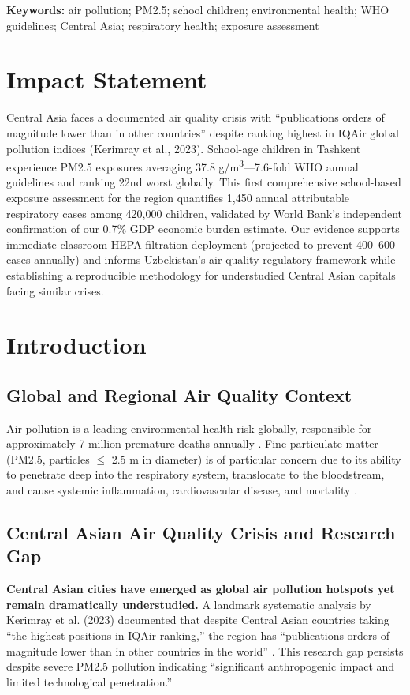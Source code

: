 \documentclass[11pt,a4paper]{article}
\begin{document}
\noindent\textbf{Keywords:} air pollution; PM2.5; school children; environmental health; WHO guidelines; Central Asia; respiratory health; exposure assessment

\section*{Impact Statement}
Central Asia faces a documented air quality crisis with ``publications orders of magnitude lower than in other countries'' despite ranking highest in IQAir global pollution indices (Kerimray et al., 2023). School-age children in Tashkent experience PM2.5 exposures averaging 37.8 \textmu g/m\textsuperscript{3}---7.6-fold WHO annual guidelines and ranking 22nd worst globally. This first comprehensive school-based exposure assessment for the region quantifies 1,450 annual attributable respiratory cases among 420,000 children, validated by World Bank's independent confirmation of our 0.7\% GDP economic burden estimate. Our evidence supports immediate classroom HEPA filtration deployment (projected to prevent 400--600 cases annually) and informs Uzbekistan's air quality regulatory framework while establishing a reproducible methodology for understudied Central Asian capitals facing similar crises.

\section{Introduction}

\subsection{Global and Regional Air Quality Context}

Air pollution is a leading environmental health risk globally, responsible for approximately 7 million premature deaths annually \citep{who2021guidelines}. Fine particulate matter (PM2.5, particles $\leq$ 2.5 \textmu m in diameter) is of particular concern due to its ability to penetrate deep into the respiratory system, translocate to the bloodstream, and cause systemic inflammation, cardiovascular disease, and mortality \citep{pope2004cardiovascular, cohen2017estimates}.

\subsection{Central Asian Air Quality Crisis and Research Gap}

\textbf{Central Asian cities have emerged as global air pollution hotspots yet remain dramatically understudied.} A landmark systematic analysis by Kerimray et al. (2023) documented that despite Central Asian countries taking ``the highest positions in IQAir ranking,'' the region has ``publications orders of magnitude lower than in other countries in the world'' \citep{kerimray2023cities}. This research gap persists despite severe PM2.5 pollution indicating ``significant anthropogenic impact and limited technological penetration.''
\end{document}
